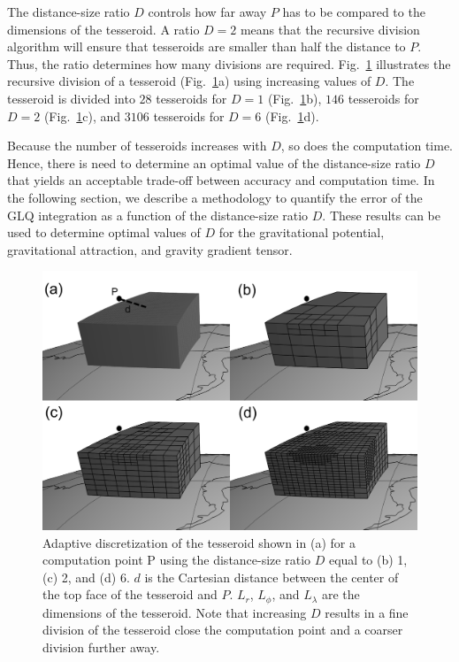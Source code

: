 The distance-size ratio $D$ controls
how far away $P$ has to be
compared to the dimensions of the tesseroid.
A ratio $D=2$ means that
the recursive division algorithm will ensure that
tesseroids are smaller than
half the distance to $P$.
Thus, the ratio determines how many divisions are required.
Fig.~\ref{fig:ratio}
illustrates the recursive division of a tesseroid
(Fig.~\ref{fig:ratio}a)
using increasing values of $D$.
The tesseroid is divided into
$28$ tesseroids for $D=1$ (Fig.~\ref{fig:ratio}b),
$146$ tesseroids for $D=2$ (Fig.~\ref{fig:ratio}c),
and $3106$ tesseroids for $D=6$ (Fig.~\ref{fig:ratio}d).

Because the number of tesseroids increases with $D$,
so does the computation time.
Hence, there is need to determine
an optimal value of the distance-size ratio $D$
that yields an acceptable trade-off between
accuracy and computation time.
In the following section,
we describe a methodology
to quantify the error of the GLQ integration
as a function of the distance-size ratio $D$.
These results can be used
to determine optimal values of $D$
for the gravitational potential,
gravitational attraction,
and gravity gradient tensor.

\begin{figure}
    \centering
    \includegraphics{figs/tesseroid-split}
    \caption{
        Adaptive discretization
        of the tesseroid shown in (a)
        for a computation point P
        using the distance-size ratio $D$ equal to
        (b) 1, (c) 2, and (d) 6.
        $d$ is the Cartesian distance between
        the center of the top face of the tesseroid
        and $P$.
        $L_r$, $L_\phi$, and $L_\lambda$ are the dimensions of the tesseroid.
        Note that increasing $D$
        results in a fine division of the tesseroid
        close the computation point
        and a coarser division further away.
    }
    \label{fig:ratio}
\end{figure}

